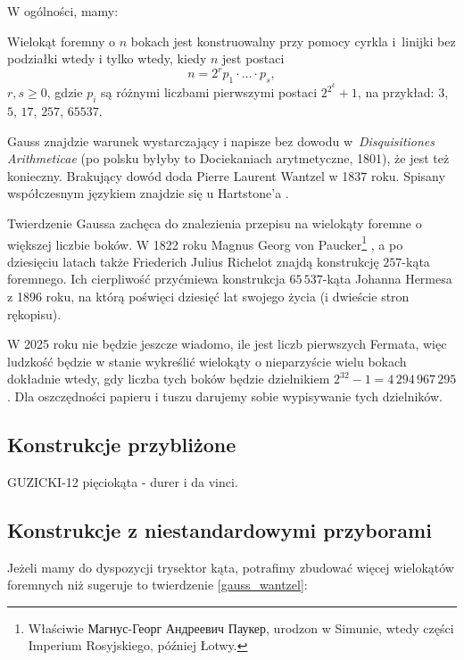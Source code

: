 W ogólności, mamy:
\begin{theorem}
    \label{gauss_wantzel}
    Wielokąt foremny o $n$ bokach jest konstruowalny przy pomocy cyrkla i~linijki bez podziałki wtedy i tylko wtedy, kiedy $n$ jest postaci
    \begin{equation}
        n = 2^r p_1 \cdot \ldots \cdot p_s,
    \end{equation}
    $r, s \ge 0$, gdzie $p_i$ są różnymi liczbami pierwszymi postaci $2^{2^k} + 1$, na przykład: $3$, $5$, $17$, $257$, $65537$.
\end{theorem}

Gauss znajdzie warunek wystarczający i napisze bez dowodu w~\emph{Disquisitiones Arithmeticae} (po polsku byłyby to Dociekaniach arytmetyczne, 1801), że jest też konieczny.
Brakujący dowód doda Pierre Laurent Wantzel w 1837 roku.
%
Spisany współczesnym językiem znajdzie się u Hartstone'a \cite[s. 258]{hartshorne2000}.

Twierdzenie Gaussa zachęca do znalezienia przepisu na wielokąty foremne o większej liczbie boków.
W 1822 roku Magnus Georg von Paucker\footnote{Właściwie Магнус-Георг Андреевич Паукер, urodzon w Simunie, wtedy części Imperium Rosyjskiego, później Łotwy.} \cite{paucker_1822}, a po dziesięciu latach także Friederich Julius Richelot \cite{richelot_1832} znajdą konstrukcję $257$-kąta foremnego. 
%
%
Ich cierpliwość przyćmiewa konstrukcja $65\,537$-kąta Johanna Hermesa z 1896 roku, na którą poświęci dziesięć lat swojego życia (i dwieście stron rękopisu).
%

W 2025 roku nie będzie jeszcze wiadomo, ile jest liczb pierwszych Fermata, więc ludzkość będzie w stanie wykreślić wielokąty o nieparzyście wielu bokach dokładnie wtedy, gdy liczba tych boków będzie dzielnikiem $2^{32} - 1 = 4\,294\,967\,295$.
Dla oszczędności papieru i tuszu darujemy sobie wypisywanie tych dzielników.


\subsection{Konstrukcje przybliżone}
GUZICKI-12 pięciokąta - durer i da vinci.

\subsection{Konstrukcje z niestandardowymi przyborami}
Jeżeli mamy do dyspozycji trysektor kąta, potrafimy zbudować więcej wielokątów foremnych niż sugeruje to twierdzenie \ref{gauss_wantzel}:

